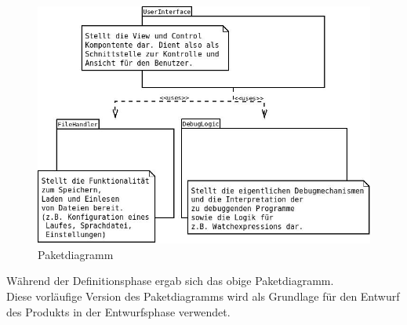 \documentclass[parskip=full]{scrartcl}
\begin{document}
\begin{figure}[!ht]
	\centering
	\includegraphics[width=1.0\textwidth]{pakete}
	\caption{Paketdiagramm}
	\label{fig:Bild3} 

\end{figure}
\vspace{0.7cm}
	Während der Definitionsphase ergab sich das obige Paketdiagramm.\\ 
	Diese vorläufige Version des Paketdiagramms wird als Grundlage für den Entwurf des
	Produkts in der Entwurfsphase verwendet.
	
\newpage
\end{document}
